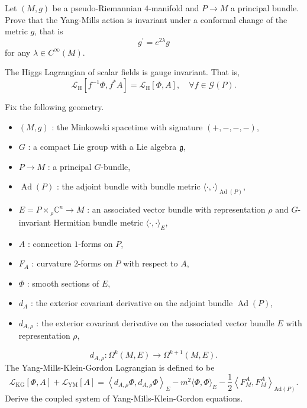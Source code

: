 \begin{exercise}
    Let $(M, g)$ be a pseudo-Riemannian $4$-manifold and $P \rightarrow M$ a principal bundle. 
    Prove that the Yang-Mills action is invariant under a conformal change of the metric $g$, that is
    $$g^{\prime}=e^{2 \lambda} g$$
    for any $\lambda \in C^{\infty}(M)$.
\end{exercise}

\begin{exercise}
    The Higgs Lagrangian of scalar fields is gauge invariant. That is,
    $$\mathscr{L}_{\mathrm{H}}\left[f^{-1} \Phi, f^{*} A\right]
    =\mathscr{L}_{\mathrm{H}}[\Phi, A], \quad \forall f \in \mathscr{G}(P).$$
\end{exercise}

\begin{exercise}
    Fix the following geometry.
    \begin{itemize}
    \item $(M, g)$ : the Minkowski spacetime with signature $(+,-,-,-)$,
    \item $G$ : a compact Lie group with a Lie algebra $\mathfrak{g}$,
    \item $P \rightarrow M$ : a principal $G$-bundle,
    \item $\operatorname{Ad}(P)$ : the adjoint bundle with bundle metric $\langle\cdot, \cdot\rangle_{\operatorname{Ad}(P)}$,
    \item $E=P \times{ }_{\rho} \mathbb{C}^{n} \rightarrow M$ : an associated vector bundle with representation $\rho$ and $G$-invariant Hermitian bundle metric $\langle\cdot, \cdot\rangle_{E}$,
    \item $A$ : connection $1$-forms on $P$,
    \item $F_{A}$ : curvature $2$-forms on $P$ with respect to $A$,
    \item $\Phi$ : smooth sections of $E$,
    \item $d_{A}$ : the exterior covariant derivative on the adjoint bundle $\operatorname{Ad}(P)$,
    \item $d_{A, \rho}$ : the exterior covariant derivative on the associated vector bundle $E$ with representation $\rho$,
    \end{itemize}
    $$d_{A, \rho}: \Omega^{k}(M, E) \longrightarrow \Omega^{k+1}(M, E).$$
    The Yang-Mills-Klein-Gordon Lagrangian is defined to be
    $$\mathscr{L}_{\mathrm{KG}}[\Phi, A]+\mathscr{L}_{\mathrm{YM}}[A]
    =\left\langle d_{A, \rho} \Phi, d_{A, \rho} \Phi\right\rangle_{E}-m^{2}\langle\Phi, 
    \Phi\rangle_{E}-\frac{1}{2}\left\langle F_{M}^{A}, 
    F_{M}^{A}\right\rangle_{\mathrm{Ad}(P)}.$$
    Derive the coupled system of Yang-Mills-Klein-Gordon equations.
\end{exercise}
